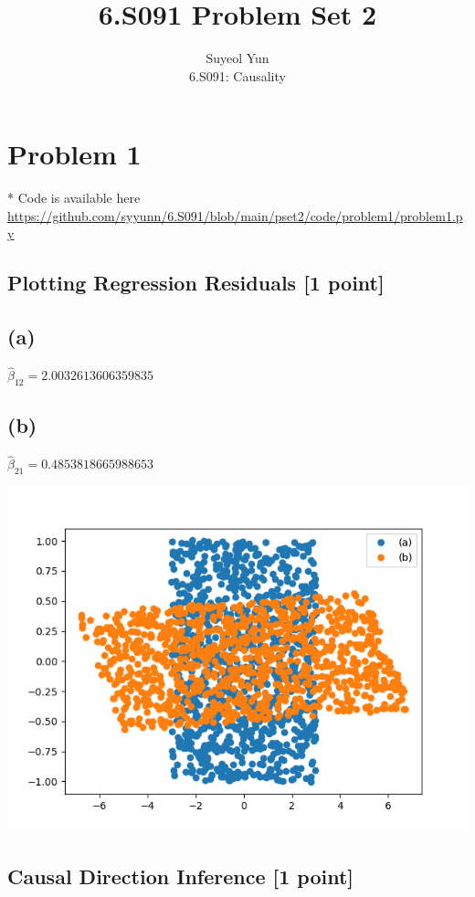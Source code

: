 \documentclass[10pt]{article}
\begin{document}
 
\title{6.S091 Problem Set 2}
\author{Suyeol Yun\\
6.S091: Causality}
\maketitle
 
\section{Problem 1}
* Code is available here \url{https://github.com/syyunn/6.S091/blob/main/pset2/code/problem1/problem1.py}

\subsection{Plotting Regression Residuals [1 point]}
\subsection{(a)} $\hat{\beta}_{12} = 2.0032613606359835$
\subsection{(b)} $\hat{\beta}_{21} = 0.4853818665988653$

\includegraphics{images/problem1.png}

\subsection{Causal Direction Inference [1 point]}
\end{document}
